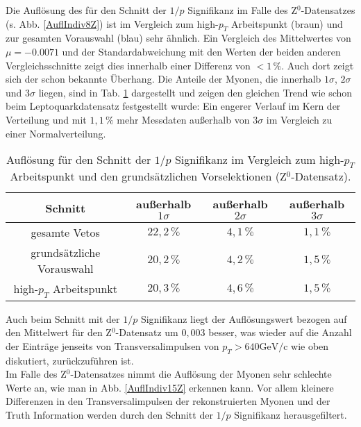 Die Auflösung des für den Schnitt der $1/p$ Signifikanz im Falle des Z$^0$-Datensatzes (s. Abb. \ref{AuflIndiv8Z}) ist im Vergleich zum high-$p_T$ Arbeitspunkt (braun) und zur gesamten Vorauswahl (blau) sehr ähnlich. Ein Vergleich des Mittelwertes von $\mu=-0.0071$ und der Standardabweichung mit den Werten der beiden anderen Vergleichsschnitte zeigt dies innerhalb einer Differenz von $<1\,\%$. Auch dort zeigt sich der schon bekannte Überhang.
Die Anteile der Myonen, die innerhalb $1\sigma$, $2\sigma$ und $3\sigma$ liegen, sind in Tab. \ref{123sigmaIndiv8Z} dargestellt und zeigen den gleichen Trend wie schon beim Leptoquarkdatensatz festgestellt wurde: Ein engerer Verlauf im Kern der Verteilung und mit $1,1\,\%$ mehr Messdaten außerhalb von $3\sigma$ im Vergleich zu einer Normalverteilung. 
\begin{table}[htbp]
		\centering
		\begin{tabular*}{\linewidth}{@{\extracolsep{\fill}}cccc}
		\hline
		\hline
		\rule[-7pt]{0pt}{23pt} Schnitt & außerhalb $1\sigma$ & außerhalb $2\sigma$ & außerhalb $3\sigma$
		\\
		\hline
		\rule[-6pt]{0pt}{21pt} gesamte Vetos               & \(22,2\,\%\) & $4,1\,\%$ & $1,1\,\%$
		\\
		\rule[-6pt]{0pt}{21pt} grundsätzliche Vorauswahl   &  \(20,2\,\%\)	& $4,2\,\%$ & $1,5\,\%$
		\\
		\rule[-6pt]{0pt}{21pt} high-$p_T$ Arbeitspunkt     &  \(20,3\,\%\)	& $4,6\,\%$ & $1,5\,\%$
		\\
		\hline
		\hline
		\end{tabular*}
		\caption[Auflösung für den Schnitt der $1/p$ Signifikanz für den Z$^0$-Datensatz]{Auflösung für den Schnitt der $1/p$ Signifikanz im Vergleich zum high-$p_T$ Arbeitspunkt und den grundsätzlichen Vorselektionen (Z$^0$-Datensatz).}
		\label{123sigmaIndiv8Z}
	\end{table}
Auch beim Schnitt mit der $1/p$ Signifikanz liegt der Auflösungswert bezogen auf den Mittel\-wert für den Z$^0$-Datensatz um $0,003$ besser, was wieder auf die Anzahl der Einträge jenseits von Transversalimpulsen von $p_T>640\text{GeV}/\text{c}$ wie oben diskutiert, zurückzuführen ist.\\
Im Falle des Z$^0$-Datensatzes nimmt die Auflösung der Myonen sehr schlechte Werte an, wie man in Abb. \ref{AuflIndiv15Z} erkennen kann. Vor allem kleinere Differenzen in den Transversalimpulsen der rekonstruierten Myonen und der Truth Information werden durch den Schnitt der $1/p$ Signifikanz herausgefiltert. 
